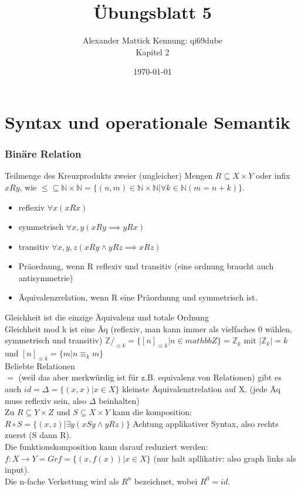 \documentclass{article}
\title{Übungsblatt 5}
\author{
Alexander Mattick Kennung: qi69dube\\
Kapitel 2
}
\date{\today}
\begin{document}
	\maketitle
	\section{Syntax und operationale Semantik}
	\subsubsection{Binäre Relation}
	Teilmenge des Kreuzprodukts zweier (ungleicher) Mengen $R\subseteq X\times Y$ oder infix $xRy$, wie $\leq\subseteq \mathbb{N}\times\mathbb{N}= \{(n,m)\in\mathbb{N}\times\mathbb{N}|\forall k\in\mathbb{N} (m=n+k)\}$.
	\begin{itemize}
		\item reflexiv $\forall x (xRx)$
		\item symmetrisch $\forall x,y( xRy\implies yRx)$
		\item transitiv $\forall x,y,z (xRy\land yRz \implies xRz)$
		\item Präordnung, wenn R reflexiv und transitiv (eine ordnung braucht auch antisymmetrie)
		\item Äquivalenzrelation, wenn R eine Präordnung und symmetrisch ist.
	\end{itemize}
	Gleichheit ist die einzige Äquivalenz und totale Ordnung\\
	Gleichheit mod k ist eine Äq (reflexiv, man kann immer als vielfaches 0 wählen, symmetrisch und transitiv)
	$\mathbb{Z}/_{\equiv k} = \{[n]_{\equiv k}|n\in mathbb{Z}\} = \mathbb{Z}_k$ mit $|\mathbb{Z}_k|=k$ und $[n]_{\equiv k}=\{m|n{\equiv_k}m\}$\\
	Beliebte Relationen\\
	$=$ (weil das aber merkwürdig ist für z.B. equivalenz von Relationen) gibt es auch $id=\Delta=\{(x,x)|x\in X\}$ kleinste Äquivalenztrelation auf X. (jede Äq muss reflexiv sein, also $\Delta$ beinhalten)\\
	Zu $R\subseteq Y\times Z$ und $S\subseteq X\times Y$ kann die komposition:\\
	$R\circ S = \{(x,z)|\exists y (xSy\land yRz)\}$ Achtung applikativer Syntax, also rechts zuerst (S dann R).\\
	Die funktionskomposition kann darauf reduziert werden: $f: X\to Y = Gr f = \{(x,f(x))|x\in X\}$ (nur halt apllikativ: also graph links als input).\\
	Die n-fache Verkettung wird als $R^n$ bezeichnet, wobei $R^0=id$.\\
\end{document}
